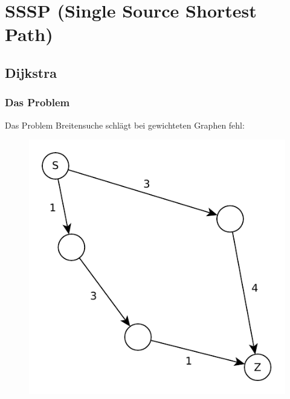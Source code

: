 \section{SSSP (Single Source Shortest Path)}
\subsection{Dijkstra}
\begin{frame}
\frametitle{Das Problem}
\begin{block}{Das Problem}
Breitensuche schlägt bei gewichteten Graphen fehl: 

\begin{figure}
\includegraphics[scale=.75]{dijkstra_graphs/bfs_fail_0.pdf}
\end{figure}

\end{block}
\end{frame}

